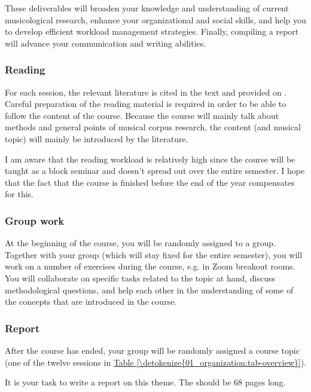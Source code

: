 \documentclass[letterpaper,10pt,english]{sphinxmanual}
\begin{document}
\sphinxAtStartPar
These deliverables will broaden your knowledge and understanding of current musicological research,
enhance your organizational and social skills, and help you to develop efficient work\sphinxhyphen{}load management strategies.
Finally, compiling a report will advance your communication and writing abilities.
\subsubsection*{Reading}

\sphinxAtStartPar
For each session, the relevant literature is cited in the text and provided on
.
Careful preparation of the reading material is required in order to be able to follow the content of the course.
Because the course will mainly talk about methods and general points of musical corpus research,
the content (and musical topic) will mainly be introduced by the literature.

\sphinxAtStartPar
I am aware that the reading workload is relatively high since the course will be taught as a block seminar
and doesn’t spread out over the entire semester. I hope that the fact that the course is finished before the
end of the year compensates for this.
\subsubsection*{Group work}

\sphinxAtStartPar
At the beginning of the course, you will be randomly assigned to a group.
Together with your group (which will stay fixed for the entire semester),
you will work on a number of exercises during the course, e.g. in Zoom breakout rooms.
You will collaborate on specific tasks related to the topic at hand, discuss methodological questions,
and help each other in the understanding of some of the concepts that are introduced in the course.
\subsubsection*{Report}

\sphinxAtStartPar
After the course has ended, your group will be randomly assigned a course topic (one of the twelve sessions in \hyperref[\detokenize{01_organization:tab-overview}]{Table \ref{\detokenize{01_organization:tab-overview}}}).

\sphinxAtStartPar
It is your task to write a report on this theme. The should be 6\textendash{}8 pages long.
\end{document}
